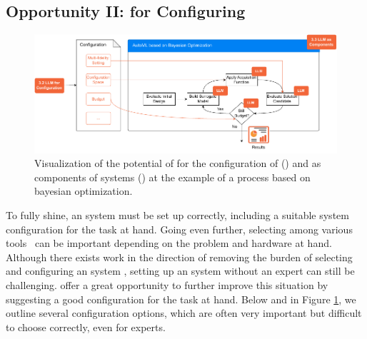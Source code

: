 \subsection{Opportunity II: \LLMs for Configuring \AutoML}
\label{llm-ssec:llms-for-configuring-automl}


\begin{figure}
    \centering
    \includegraphics[width=1.\textwidth]{chapters/human-centric/llm/img/llms_for_automl_configuration.pdf}
    \caption{Visualization of the potential of \LLMs for the configuration of \AutoML () and \LLMs as components of \AutoML systems () at the example of a \AutoML process based on bayesian optimization.}
    \label{llm-fig:llms_for_automl_configuration}
\end{figure}

To fully shine, an \AutoML system must be set up correctly, including a suitable system configuration for the task at hand. Going even further, selecting among various \AutoML tools~\cite{thornton-kdd13a, feurer-nips15a, akiba-kdd19a, jin-sigkdd19a, erickson-arxiv20a, zimmer-tpami21a} can be important depending on the problem and hardware at hand. Although there exists work in the direction of removing the burden of selecting and configuring an \AutoML system \cite{feurer-automl18b,tornede-mlj22a,feurer-jmlr22a,moosbauer-tec22a}, setting up an \AutoML system without an expert can still be challenging. \LLMs offer a great opportunity to further improve this situation by suggesting a good configuration for the task at hand. Below and in Figure \ref{llm-fig:llms_for_automl_configuration}, we outline several configuration options, which are often very important but difficult to choose correctly, even for experts. 

